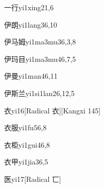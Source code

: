 \begin{entry}{一行}{yi1xing2}{1,6}
\end{entry}

\begin{entry}{伊朗}{yi1lang3}{6,10}
\end{entry}

\begin{entry}{伊马姆}{yi1ma3mu3}{6,3,8}
\end{entry}

\begin{entry}{伊玛目}{yi1ma3mu4}{6,7,5}
\end{entry}

\begin{entry}{伊曼}{yi1man4}{6,11}
\end{entry}

\begin{entry}{伊斯兰}{yi1si1lan2}{6,12,5}
\end{entry}

\begin{entry}{衣}{yi1}{6}[Radical 衣][Kangxi 145]
\end{entry}

\begin{entry}{衣服}{yi1fu5}{6,8}
\end{entry}

\begin{entry}{衣柜}{yi1gui4}{6,8}
\end{entry}

\begin{entry}{衣甲}{yi1jia3}{6,5}
\end{entry}

\begin{entry}{医}{yi1}{7}[Radical 匸]
\end{entry}

